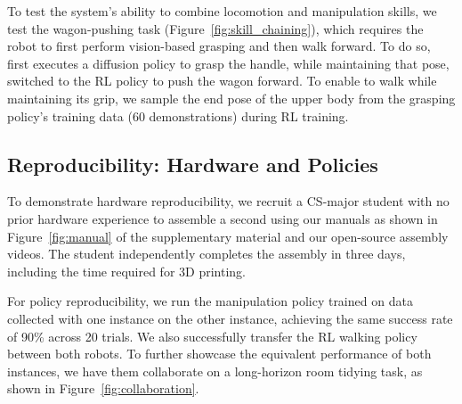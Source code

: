 To test the system's ability to combine locomotion and manipulation skills, we test the wagon-pushing task (Figure~\ref{fig:skill_chaining}), which requires the robot to first perform vision-based grasping and then walk forward. 
To do so, \system first executes a diffusion policy to grasp the handle, while maintaining that pose, switched to the RL policy to push the wagon forward. To enable \system to walk while maintaining its grip, we sample the end pose of the upper body from the grasping policy’s training data (60 demonstrations) during RL training. 

\subsection{Reproducibility: Hardware and Policies}

To demonstrate hardware reproducibility, we recruit a CS-major student with no prior hardware experience to assemble a second \system using our manuals as shown in Figure~\ref{fig:manual} of the supplementary material and our open-source assembly videos. The student independently completes the assembly in three days, including the time required for 3D printing.

For policy reproducibility, we run the manipulation policy trained on data collected with one instance on the other instance, achieving the same success rate of 90\% across 20 trials. We also successfully transfer the RL walking policy between both robots. To further showcase the equivalent performance of both \system instances, we have them collaborate on a long-horizon room tidying task, as shown in Figure~\ref{fig:collaboration}.




